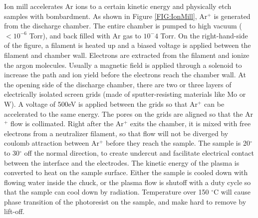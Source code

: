 \documentclass[pdflatex, sectionletters, 12pt]{pittetd}    %
\begin{document}
Ion mill accelerates Ar ions to a certain kinetic energy and physically etch samples with bombardment. As shown in Figure \ref{FIG:IonMill}, Ar$^+$ is generated from the discharge chamber. The entire chamber is pumped to high vacuum ($< 10^{-6}$ Torr), and back filled with Ar gas to $10^-4$ Torr. On the right-hand-side of the figure, a filament is heated up and a biased voltage is applied between the filament and chamber wall. Electrons are extracted from the filament and ionize the argon molecules. Usually a magnetic field is applied through a solenoid to increase the path and ion yield before the electrons reach the chamber wall. At the opening side of the discharge chamber, there are two or three layers of electrically isolated screen grids (made of sputter-resisting materials like Mo or W). A voltage of 500eV is applied between the grids so that Ar$^+$ can be accelerated to the same energy. The pores on the grids are aligned so that the Ar$^{+}$ flow is collimated. Right after the Ar$^{+}$ exits the chamber, it is mixed with free electrons from a neutralizer filament, so that flow will not be diverged by coulomb attraction between Ar$^{+}$ before they reach the sample. The sample is 20$^{\circ}$ to 30$^{\circ}$ off the normal direction, to create undercut and facilitate electrical contact between the interface and the electrodes. The kinetic energy of the plasma is converted to heat on the sample surface. Either the sample is cooled down with flowing water inside the chuck, or the plasma flow is shutoff with a duty cycle so that the sample can cool down by radiation. Temperature over 150 $^{\circ}$C will cause phase transition of the photoresist on the sample, and make hard to remove by lift-off.
\end{document}
